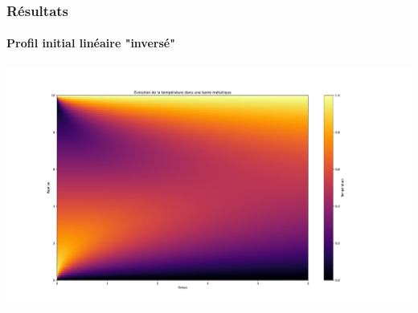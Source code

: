 \documentclass{beamer}
\begin{document}
    \begin{frame}
    \frametitle{Résultats}
    \framesubtitle{Profil initial linéaire "inversé"}

    \begin{center}
    \includegraphics[width=1.2\linewidth]{figs/Figure_5.pdf}
    \end{center}


    \end{frame}
\end{document}
